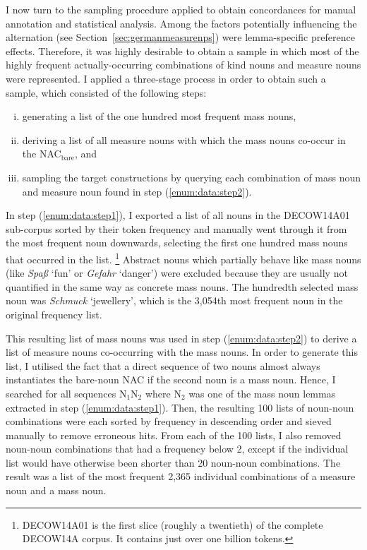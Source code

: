\documentclass[USenglish]{article}
\newcommand{\Sub}[1]{\ensuremath{\mathrm{_{#1}}}}
\newcommand{\NACb}{NAC\Sub{bare}}
\begin{document}
I now turn to the sampling procedure applied to obtain concordances for manual annotation and statistical analysis.
Among the factors potentially influencing the alternation (see Section~\ref{sec:germanmeasurenps}) were lemma-specific preference effects.
Therefore, it was highly desirable to obtain a sample in which most of the highly frequent actually-occurring combinations of kind nouns and measure nouns were represented.
I applied a three-stage process in order to obtain such a sample, which consisted of the following steps:

\begin{enumerate}[i.]
  \item\label{enum:data:step1} generating a list of the one hundred most frequent mass nouns,
  \item\label{enum:data:step2} deriving a list of all measure nouns with which the mass nouns co-occur in the \NACb, and 
  \item\label{enum:data:step3} sampling the target constructions by querying each combination of mass noun and measure noun found in step (\ref{enum:data:step2}).
\end{enumerate}

\vspace{-1\baselineskip}

In step (\ref{enum:data:step1}), I exported a list of all nouns in the DECOW14A01 sub-corpus sorted by their token frequency and manually went through it from the most frequent noun downwards, selecting the first one hundred mass nouns that occurred in the list.%
\footnote{DECOW14A01 is the first slice (roughly a twentieth) of the complete DECOW14A corpus.
It contains just over one billion tokens.}
Abstract nouns which partially behave like mass nouns (like \textit{Spaß} `fun’ or \textit{Gefahr} `danger’) were excluded because they are usually not quantified in the same way as concrete mass nouns.
The hundredth selected mass noun was \textit{Schmuck} `jewellery’, which is the 3,054th most frequent noun in the original frequency list.

This resulting list of mass nouns was used in step (\ref{enum:data:step2}) to derive a list of measure nouns co-occurring with the mass nouns. 
In order to generate this list, I utilised the fact that a direct sequence of two nouns almost always instantiates the bare-noun NAC if the second noun is a mass noun.
Hence, I searched for all sequences N\Sub{1}N\Sub{2} where N\Sub{2} was one of the mass noun lemmas extracted in step (\ref{enum:data:step1}).
Then, the resulting 100 lists of noun-noun combinations were each sorted by frequency in descending order and sieved manually to remove erroneous hits.
From each of the 100 lists, I also removed noun-noun combinations that had a frequency below 2, except if the individual list would have otherwise been shorter than 20 noun-noun combinations.
The result was a list of the most frequent 2,365 individual combinations of a measure noun and a mass noun.
\end{document}
